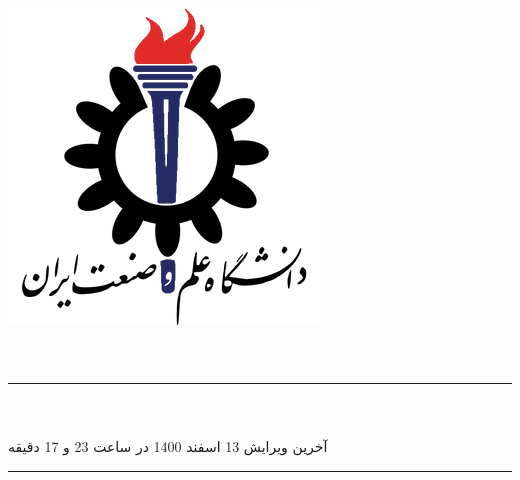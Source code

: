 \begin{titlepage}
    \centering
    \includegraphics[scale = 0.5]{Images/IUSTLogo.png}\\
    \Huge{\Faculty}\\[0.2 cm]
    \huge{\Course}\\[0.2 cm]
    \LARGE{\Semester}
    
    \rule{\linewidth}{1.0 mm}
    \huge{\Subject}\\[0.2 cm]
    \LARGE{\Title}\\[0.4 cm]
    \large{آخرین ویرایش 13 اسفند 1400 در ساعت 23 و 17 دقیقه}
    \rule{\linewidth}{1.0 mm}\\[1.0 cm]
    
    \LARGE
    \begin{minipage}{0.95 \textwidth}
        \centering
	    \Prof \dotfill \prof\\[0.15 cm]
	    \Members \dotfill \members\\[0.15 cm]
	    \SID \dotfill \sid\\[0.15 cm]
	\end{minipage}

\end{titlepage}